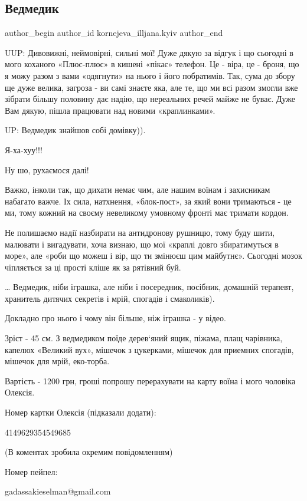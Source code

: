  
 
 
 
 

\subsection{Ведмедик}
\label{sec:13_10_2022.fb.kornejeva_illjana.kyiv.1.vedmedik}

\ifcmt
 author_begin
   author_id kornejeva_illjana.kyiv
 author_end
\fi

UUP: Дивовижні, неймовірні, сильні мої! Дуже дякую за відгук і що сьогодні в
мого  коханого «Плюс-плюс» в кишені «пікає» телефон. Це - віра, це - броня, що
я можу разом з вами «одягнути» на нього і його побратимів. Так, сума до збору
ще дуже велика, загроза - ви самі знаєте яка, але те, що ми всі разом змогли
вже зібрати більшу половину дає надію, що нереальних речей майже не буває. Дуже
Вам дякую, пішла працювати над новими «краплинками».

UP: Ведмедик знайшов собі домівку)). 

Я-ха-хуу!!! 

Ну шо, рухаємося далі! 

Важко, інколи так, що дихати немає чим, але нашим воїнам і захисникам набагато
важче. Іх сила, натхнення, «блок-пост», за який вони тримаються - це ми, тому
кожний на своєму невеликому умовному фронті має тримати кордон. 

Не полишаємо надії назбирати на антидронову рушницю, тому буду шити, малювати і
вигадувати, хоча визнаю, що мої «краплі довго збиратимуться в море», але «роби
що можеш і вір, що ти змінюєш цим майбутнє». Сьогодні мозок чіпляється за ці
прості кліше як за рятівний буй. 

… Ведмедик, ніби іграшка, але ніби і посередник, посібник, домашній терапевт,
хранитель дитячих секретів і мрій, спогадів і смаколиків).

Докладно про нього і чому він більше, ніж іграшка - у відео.

Зріст - 45 см. З ведмедиком поїде дерев‘яний ящик, піжама, плащ чарівника,
капелюх «Великий вух», мішечок з цукерками, мішечок для приемних спогадів,
мішечок для мрій, еко-торба.

Вартість - 1200 грн, гроші попрошу перерахувати на карту воїна і мого чоловіка
Олексія.

Номер картки Олексія (підказали додати):

4149629354549685

(В коментах зробила окремим повідомленням)

Номер пейпел:

gadassakieselman@gmail.com
